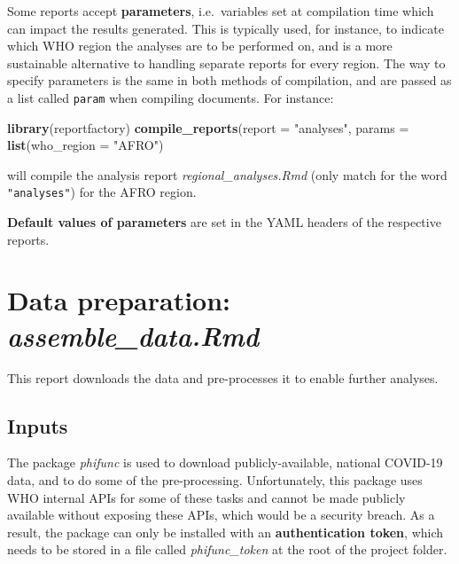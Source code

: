 \documentclass[]{book}
\newenvironment{Shaded}{\begin{snugshade}}{\end{snugshade}}
\newcommand{\DataTypeTok}[1]{\textcolor[rgb]{0.13,0.29,0.53}{#1}}
\newcommand{\KeywordTok}[1]{\textcolor[rgb]{0.13,0.29,0.53}{\textbf{#1}}}
\newcommand{\NormalTok}[1]{#1}
\newcommand{\StringTok}[1]{\textcolor[rgb]{0.31,0.60,0.02}{#1}}
\begin{document}
Some reports accept \textbf{parameters}, i.e.~variables set at compilation time which can
impact the results generated. This is typically used, for instance, to indicate
which WHO region the analyses are to be performed on, and is a more sustainable
alternative to handling separate reports for every region. The way to specify
parameters is the same in both methods of compilation, and are passed as a list
called \texttt{param} when compiling documents. For instance:

\begin{Shaded}
\begin{Highlighting}[]

\KeywordTok{library}\NormalTok{(reportfactory)}
\KeywordTok{compile_reports}\NormalTok{(}\DataTypeTok{report =} \StringTok{"analyses"}\NormalTok{,}
                \DataTypeTok{params =} \KeywordTok{list}\NormalTok{(}\DataTypeTok{who_region =} \StringTok{"AFRO"}\NormalTok{)}
\end{Highlighting}
\end{Shaded}

will compile the analysis report \emph{regional\_analyses.Rmd} (only match for the
word \texttt{"analyses"}) for the AFRO region.

\textbf{Default values of parameters} are set in the YAML headers of the respective
reports.

\hypertarget{data-preparation-assemble_data.rmd}{%
\section{\texorpdfstring{Data preparation: \emph{assemble\_data.Rmd}}{Data preparation: assemble\_data.Rmd}}\label{data-preparation-assemble_data.rmd}}

This report downloads the data and pre-processes it to enable further analyses.

\hypertarget{inputs}{%
\subsection{Inputs}\label{inputs}}

The package \emph{phifunc} is used to download publicly-available, national COVID-19
data, and to do some of the pre-processing. Unfortunately, this package uses WHO
internal APIs for some of these tasks and cannot be made publicly available
without exposing these APIs, which would be a security breach. As a result, the
package can only be installed with an \textbf{authentication token}, which needs to be
stored in a file called \emph{phifunc\_token} at the root of the project folder.
\end{document}
